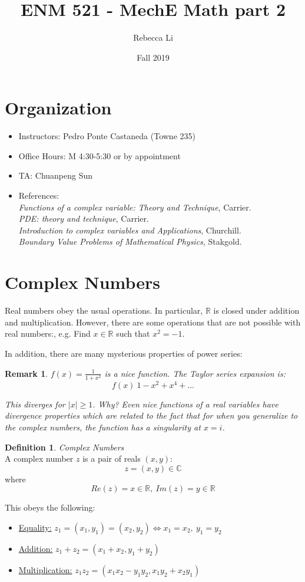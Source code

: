 \documentclass{article}
\title{ENM 521 - MechE Math part 2}
\author{Rebecca Li}
\date{Fall 2019}
\newtheorem*{remark}{Remark}
\theoremstyle{definition}
\newtheorem{definition}{Definition}[section]
\newcommand{\Def}[2]{
\begin{shaded*}
\begin{definition}{\textit{#1}}\\#2\end{definition}
\end{shaded*}
}
\def\R{\mathbb{R}}
\def\C{\mathbb{C}}
\begin{document}
	\maketitle
	\tableofcontents
	
\section*{Organization}
\begin{itemize}
	\item Instructors: Pedro Ponte Castaneda  (Towne 235)
	\item Office Hours: M 4:30-5:30 or by appointment 
	\item TA: Chuanpeng Sun
	\item References: 
	\\\textit{Functions of a complex variable: Theory and Technique}, Carrier. 
	\\\textit{PDE: theory and technique}, Carrier. 
	\\\textit{Introduction to complex variables and Applications}, Churchill. 
	\\\textit{Boundary Value Problems of Mathematical Physics}, Stakgold.

\end{itemize}
\section{Complex Numbers}
Real numbers obey the usual operations. In particular, $\R$ is closed under addition and multiplication. However, there are some operations that are not possible with real numbers:, e.g. Find $x \in \R$ such that $x^2 = -1$.


In addition, there are many mysterious properties of power series:

\begin{remark}
$f(x) = \frac{1}{1+x^2}$ is a nice function. The Taylor series expansion is:
	$$f(x) ~ 1-x^2+x^4+...$$
	
	This diverges for $|x| \geq 1$. Why?
	Even nice functions of a real variables have divergence properties which are related to the fact that for when you generalize to the complex numbers, the function has a singularity at $x=i$.
\end{remark}

\Def{Complex Numbers}{A complex number $z$ is a pair of reals $(x,y):$
$$z = (x,y) \in \C$$
where
$$Re(z) = x \in \R,\ Im(z) = y \in \R$$

This obeys the following:
\begin{itemize}
	\item \underline{Equality:} $z_1 = (x_1, y_1) = (x_2, y_2) \iff x_1 = x_2,\ y_1 = y_2$
	\item \underline{Addition:} $z_1 + z_2 = (x_1 + x_2, y_1+y_2)$
	\item \underline{Multiplication:} $z_1 z_2 = (x_1 x_2 - y_1 y_2, x_1 y_2 + x_2 y_1)$
\end{itemize}
}
\end{document}
